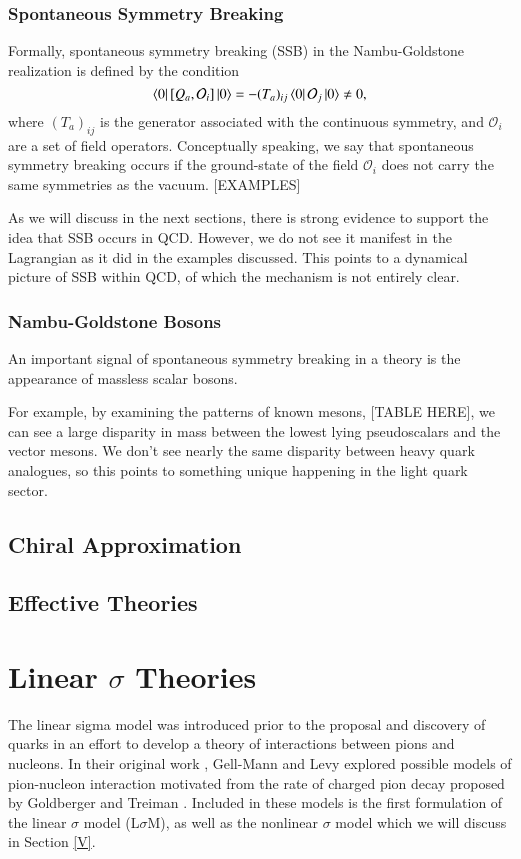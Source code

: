 \documentclass[aps,prd,onecolumn,showpacs,amsmath,amssymb,nofootinbib]{revtex4} \pdfoutput=1
\newcommand{\lsm}{L$\sigma$M}
\begin{document}
\subsubsection{Spontaneous Symmetry Breaking}
Formally, spontaneous symmetry breaking (SSB) in the Nambu-Goldstone realization is defined by the condition
\begin{equation}\label{eq:ssb}
    \bra{0} \left[ Q_{a},\mathcal{O}_{i}\right]\ket{0} = -(T_{a})_{ij}\bra{0}\mathcal{O}_{j}\ket{0}\neq 0,
\end{equation}
where $(T_{a})_{ij}$ is the generator associated with the continuous symmetry, and $\mathcal{O}_i$ are a set of field operators. Conceptually speaking, we say that spontaneous symmetry breaking occurs if the ground-state of the field $\mathcal{O}_{i}$ does not carry the same symmetries as the vacuum.
[EXAMPLES]

As we will discuss in the next sections, there is strong evidence to support the idea that SSB occurs in QCD. However, we do not see it manifest in the Lagrangian as it did in the examples discussed. This points to a dynamical picture of SSB within QCD, of which the mechanism is not entirely clear. 
\subsubsection{Nambu-Goldstone Bosons}
An important signal of spontaneous symmetry breaking in a theory is the appearance of massless scalar bosons.

For example, by examining the patterns of known mesons, [TABLE HERE], we can see a large disparity in mass between the lowest lying pseudoscalars and the vector mesons. 
We don't see nearly the same disparity between heavy quark analogues, so this points to something unique happening in the light quark sector.

\subsection{Chiral Approximation}
\subsection{Effective Theories}

\section{Linear $\sigma$ Theories}\label{IV}

The linear sigma model was introduced prior to the proposal and discovery of quarks in an effort to develop a theory of interactions between pions and nucleons. In their original work \cite{GellMann1960}, Gell-Mann and Levy explored possible models of pion-nucleon interaction motivated from the rate of charged pion decay proposed by Goldberger and Treiman \cite{Goldberger1958}. Included in these models is the first formulation of the linear $\sigma$ model (\lsm), as well as the nonlinear $\sigma$ model which we will discuss in Section \ref{V}.
\end{document}
